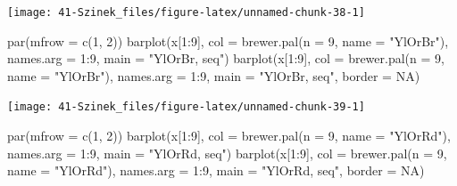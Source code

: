 \documentclass[
]{book}
\newenvironment{Shaded}{\begin{snugshade}}{\end{snugshade}}
\newcommand{\AttributeTok}[1]{\textcolor[rgb]{0.77,0.63,0.00}{#1}}
\newcommand{\ConstantTok}[1]{\textcolor[rgb]{0.00,0.00,0.00}{#1}}
\newcommand{\DecValTok}[1]{\textcolor[rgb]{0.00,0.00,0.81}{#1}}
\newcommand{\FunctionTok}[1]{\textcolor[rgb]{0.00,0.00,0.00}{#1}}
\newcommand{\NormalTok}[1]{#1}
\newcommand{\SpecialCharTok}[1]{\textcolor[rgb]{0.00,0.00,0.00}{#1}}
\newcommand{\StringTok}[1]{\textcolor[rgb]{0.31,0.60,0.02}{#1}}
\begin{document}
\begin{center}\texttt{[image: 41-Szinek\_files/figure-latex/unnamed-chunk-38-1]} \end{center}

\begin{Shaded}
\begin{Highlighting}[]
\FunctionTok{par}\NormalTok{(}\AttributeTok{mfrow =} \FunctionTok{c}\NormalTok{(}\DecValTok{1}\NormalTok{, }\DecValTok{2}\NormalTok{))}
\FunctionTok{barplot}\NormalTok{(x[}\DecValTok{1}\SpecialCharTok{:}\DecValTok{9}\NormalTok{], }\AttributeTok{col =} \FunctionTok{brewer.pal}\NormalTok{(}\AttributeTok{n =} \DecValTok{9}\NormalTok{, }\AttributeTok{name =} \StringTok{"YlOrBr"}\NormalTok{), }\AttributeTok{names.arg =} \DecValTok{1}\SpecialCharTok{:}\DecValTok{9}\NormalTok{, }\AttributeTok{main =} \StringTok{"YlOrBr, seq"}\NormalTok{)}
\FunctionTok{barplot}\NormalTok{(x[}\DecValTok{1}\SpecialCharTok{:}\DecValTok{9}\NormalTok{], }\AttributeTok{col =} \FunctionTok{brewer.pal}\NormalTok{(}\AttributeTok{n =} \DecValTok{9}\NormalTok{, }\AttributeTok{name =} \StringTok{"YlOrBr"}\NormalTok{), }\AttributeTok{names.arg =} \DecValTok{1}\SpecialCharTok{:}\DecValTok{9}\NormalTok{, }\AttributeTok{main =} \StringTok{"YlOrBr, seq"}\NormalTok{, }
    \AttributeTok{border =} \ConstantTok{NA}\NormalTok{)}
\end{Highlighting}
\end{Shaded}

\begin{center}\texttt{[image: 41-Szinek\_files/figure-latex/unnamed-chunk-39-1]} \end{center}

\begin{Shaded}
\begin{Highlighting}[]
\FunctionTok{par}\NormalTok{(}\AttributeTok{mfrow =} \FunctionTok{c}\NormalTok{(}\DecValTok{1}\NormalTok{, }\DecValTok{2}\NormalTok{))}
\FunctionTok{barplot}\NormalTok{(x[}\DecValTok{1}\SpecialCharTok{:}\DecValTok{9}\NormalTok{], }\AttributeTok{col =} \FunctionTok{brewer.pal}\NormalTok{(}\AttributeTok{n =} \DecValTok{9}\NormalTok{, }\AttributeTok{name =} \StringTok{"YlOrRd"}\NormalTok{), }\AttributeTok{names.arg =} \DecValTok{1}\SpecialCharTok{:}\DecValTok{9}\NormalTok{, }\AttributeTok{main =} \StringTok{"YlOrRd, seq"}\NormalTok{)}
\FunctionTok{barplot}\NormalTok{(x[}\DecValTok{1}\SpecialCharTok{:}\DecValTok{9}\NormalTok{], }\AttributeTok{col =} \FunctionTok{brewer.pal}\NormalTok{(}\AttributeTok{n =} \DecValTok{9}\NormalTok{, }\AttributeTok{name =} \StringTok{"YlOrRd"}\NormalTok{), }\AttributeTok{names.arg =} \DecValTok{1}\SpecialCharTok{:}\DecValTok{9}\NormalTok{, }\AttributeTok{main =} \StringTok{"YlOrRd, seq"}\NormalTok{, }
    \AttributeTok{border =} \ConstantTok{NA}\NormalTok{)}
\end{Highlighting}
\end{Shaded}
\end{document}
